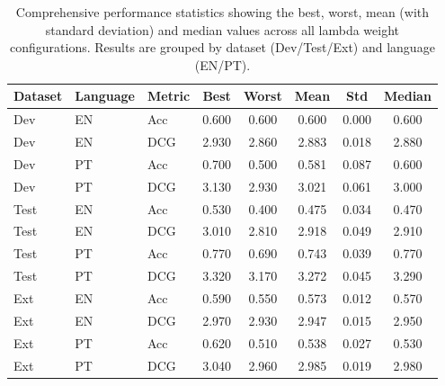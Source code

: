 \begin{table}[htbp]
\caption{Comprehensive Performance Statistics Across All Lambda Values}
\label{tab:performance_stats}
\begin{table}[htbp]
\centering
\footnotesize
\begin{tabular}{lllccccc}
\toprule
Dataset & Language & Metric & Best & Worst & Mean & Std & Median \\
\midrule
Dev & EN & Acc & 0.600 & 0.600 & 0.600 & 0.000 & 0.600 \\
Dev & EN & DCG & 2.930 & 2.860 & 2.883 & 0.018 & 2.880 \\
Dev & PT & Acc & 0.700 & 0.500 & 0.581 & 0.087 & 0.600 \\
Dev & PT & DCG & 3.130 & 2.930 & 3.021 & 0.061 & 3.000 \\
Test & EN & Acc & 0.530 & 0.400 & 0.475 & 0.034 & 0.470 \\
Test & EN & DCG & 3.010 & 2.810 & 2.918 & 0.049 & 2.910 \\
Test & PT & Acc & 0.770 & 0.690 & 0.743 & 0.039 & 0.770 \\
Test & PT & DCG & 3.320 & 3.170 & 3.272 & 0.045 & 3.290 \\
Ext & EN & Acc & 0.590 & 0.550 & 0.573 & 0.012 & 0.570 \\
Ext & EN & DCG & 2.970 & 2.930 & 2.947 & 0.015 & 2.950 \\
Ext & PT & Acc & 0.620 & 0.510 & 0.538 & 0.027 & 0.530 \\
Ext & PT & DCG & 3.040 & 2.960 & 2.985 & 0.019 & 2.980 \\
\bottomrule
\end{tabular}
\caption{Comprehensive performance statistics showing the best, worst, mean (with standard deviation) and median values across all lambda weight configurations. Results are grouped by dataset (Dev/Test/Ext) and language (EN/PT).}
\end{table}
\end{table}
